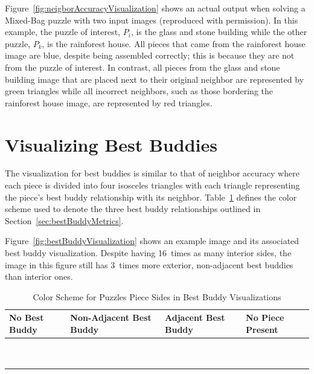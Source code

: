 Figure~\ref{fig:neigborAccuracyVisualization} shows an actual output when solving a Mixed-Bag puzzle with two input images (reproduced with permission).  In this example, the puzzle of interest, $P_i$, is the glass and stone building while the other puzzle, $P_k$, is the rainforest house.  All pieces that came from the rainforest house image are blue, despite being assembled correctly; this is because they are not from the puzzle of interest.  In contrast, all pieces from the glass and stone building image that are placed next to their original neighbor are represented by green triangles while all incorrect neighbors, such as those bordering the rainforest house image, are represented by red triangles.

\section{Visualizing Best Buddies}\label{sec:visualizingBestBuddies}

The visualization for best buddies is similar to that of neighbor accuracy where each piece is divided into four isosceles triangles with each triangle representing the piece's best buddy relationship with its neighbor.  Table~\ref{tab:bestBuddyColors} defines the color scheme used to denote the three best buddy relationships outlined in Section~\ref{sec:bestBuddyMetrics}.  

Figure~\ref{fig:bestBuddyVisualization} shows an example image and its associated best buddy visualization.  Despite having 16~times as many interior sides, the image in this figure still has 3~times more exterior, non-adjacent best buddies than interior ones.

\clearpage

\begin{table}[tb]
\begin{center}
  \caption{Color Scheme for Puzzles Piece Sides in Best Buddy Visualizations}\label{tab:bestBuddyColors}
  \begin{tabular}{ | >{\centering\arraybackslash}m{1.0in} | >{\centering\arraybackslash}m{1.0in} | >{\centering\arraybackslash}m{1.0in} | >{\centering\arraybackslash}m{1.0in} | }
  
   \hline
    No Best Buddy & Non-Adjacent Best Buddy & Adjacent Best Buddy & No Piece Present  \\ \hline
	{\cellcolor{white}~} & {\cellcolor{red}~} & {\cellcolor{green}~} & {\cellcolor{black}~}  \\
	{\cellcolor{white}~} & {\cellcolor{red}~} & {\cellcolor{green}~} & {\cellcolor{black}~}  \\
 \hline

  \end{tabular}
\end{center}
\end{table}


